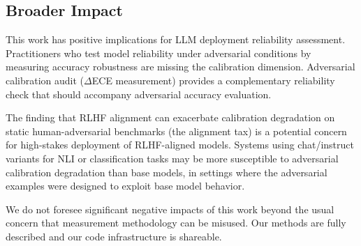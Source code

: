 \subsection{Broader Impact}

This work has positive implications for LLM deployment reliability assessment. Practitioners who test model reliability under adversarial conditions by measuring accuracy robustness are missing the calibration dimension. Adversarial calibration audit ($\Delta$ECE measurement) provides a complementary reliability check that should accompany adversarial accuracy evaluation.

The finding that RLHF alignment can exacerbate calibration degradation on static human-adversarial benchmarks (the alignment tax) is a potential concern for high-stakes deployment of RLHF-aligned models. Systems using chat/instruct variants for NLI or classification tasks may be more susceptible to adversarial calibration degradation than base models, in settings where the adversarial examples were designed to exploit base model behavior.

We do not foresee significant negative impacts of this work beyond the usual concern that measurement methodology can be misused. Our methods are fully described and our code infrastructure is shareable.
